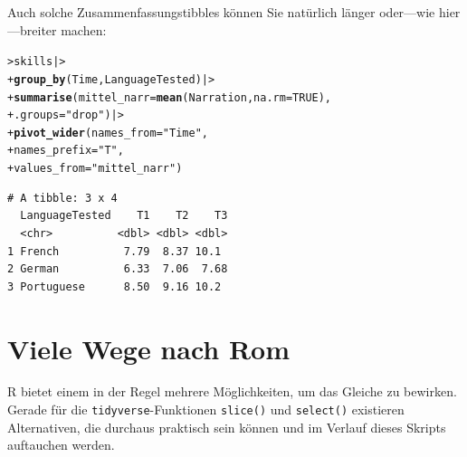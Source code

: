 \documentclass[oneside, 10pt]{book}\usepackage[]{graphicx}\usepackage[]{xcolor}
\makeatletter
\newcommand{\hlnum}[1]{\textcolor[rgb]{0.686,0.059,0.569}{#1}}%
\newcommand{\hlstr}[1]{\textcolor[rgb]{0.192,0.494,0.8}{#1}}%
\newcommand{\hlstd}[1]{\textcolor[rgb]{0.345,0.345,0.345}{#1}}%
\newcommand{\hlkwc}[1]{\textcolor[rgb]{0.333,0.667,0.333}{#1}}%
\newcommand{\hlkwd}[1]{\textcolor[rgb]{0.737,0.353,0.396}{\textbf{#1}}}%
\newenvironment{kframe}{%
 \def\at@end@of@kframe{}%
 \ifinner\ifhmode%
  \def\at@end@of@kframe{\end{minipage}}%
  \begin{minipage}{\columnwidth}%
 \fi\fi%
 \def\FrameCommand##1{\hskip\@totalleftmargin \hskip-\fboxsep
 \colorbox{shadecolor}{##1}\hskip-\fboxsep
     \hskip-\linewidth \hskip-\@totalleftmargin \hskip\columnwidth}%
 \MakeFramed {\advance\hsize-\width
   \@totalleftmargin\z@ \linewidth\hsize
   \@setminipage}}%
 {\par\unskip\endMakeFramed%
 \at@end@of@kframe}
\newenvironment{knitrout}{}{} %
\makeatother
\begin{document}
Auch solche Zusammenfassungstibbles können Sie natürlich
länger oder---wie hier---breiter machen:
\begin{knitrout}
\color{fgcolor}\begin{kframe}
\begin{alltt}
\hlstd{> }\hlstd{skills |>}
\hlstd{+ }  \hlkwd{group_by}\hlstd{(Time, LanguageTested) |>}
\hlstd{+ }  \hlkwd{summarise}\hlstd{(}\hlkwc{mittel_narr} \hlstd{=} \hlkwd{mean}\hlstd{(Narration,} \hlkwc{na.rm} \hlstd{=} \hlnum{TRUE}\hlstd{),}
\hlstd{+ }            \hlkwc{.groups} \hlstd{=} \hlstr{"drop"}\hlstd{) |>}
\hlstd{+ }  \hlkwd{pivot_wider}\hlstd{(}\hlkwc{names_from} \hlstd{=} \hlstr{"Time"}\hlstd{,}
\hlstd{+ }              \hlkwc{names_prefix} \hlstd{=} \hlstr{"T"}\hlstd{,}
\hlstd{+ }              \hlkwc{values_from} \hlstd{=} \hlstr{"mittel_narr"}\hlstd{)}
\end{alltt}
\begin{verbatim}
# A tibble: 3 x 4
  LanguageTested    T1    T2    T3
  <chr>          <dbl> <dbl> <dbl>
1 French          7.79  8.37 10.1 
2 German          6.33  7.06  7.68
3 Portuguese      8.50  9.16 10.2 
\end{verbatim}
\end{kframe}
\end{knitrout}

\section{Viele Wege nach Rom}
R bietet einem in der Regel mehrere Möglichkeiten,
um das Gleiche zu bewirken. Gerade für die
\texttt{tidyverse}-Funktionen
\texttt{slice()} und \texttt{select()}
existieren Alternativen, die durchaus praktisch
sein können und im Verlauf dieses Skripts auftauchen werden.
\end{document}
